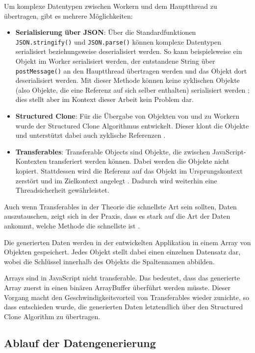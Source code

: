Um komplexe Datentypen zwischen Workern und dem Hauptthread zu übertragen, gibt es mehrere Möglichkeiten:
\begin{itemize}
    \item \textbf{Serialisierung über JSON}: Über die Standardfunktionen \texttt{JSON.stringify()} und \texttt{JSON.parse()} können komplexe Datentypen serialisiert beziehungsweise deserialisiert werden. So kann beispielsweise ein Objekt im Worker serialisiert werden, der entstandene String über \texttt{postMessage()} an den Hauptthread übertragen werden und das Objekt dort deserialisiert werden. Mit dieser Methode können keine zyklischen Objekte (also Objekte, die eine Referenz auf sich selber enthalten) serialisiert werden \cite{mdn:json_stringify}; dies stellt aber im Kontext dieser Arbeit kein Problem dar.
    \item \textbf{Structured Clone}: Für die Übergabe von Objekten von und zu Workern wurde der Structured Clone Algorithmus entwickelt. Dieser klont die Objekte und unterstützt dabei auch zyklische Referenzen \cite{mdn:structured_cloning}.
    \item \textbf{Transferables}: Transferable Objects sind Objekte, die zwischen JavaScript-Kon\-texten transferiert werden können. Dabei werden die Objekte nicht kopiert. Stattdessen wird die Referenz auf das Objekt im Ursprungskontext zerstört und im Zielkontext angelegt \cite{googledev:transferables}. Dadurch wird weiterhin eine Threadsicherheit gewährleistet.
\end{itemize}

Auch wenn Transferables in der Theorie die schnellste Art sein sollten, Daten auszutauschen, zeigt sich in der Praxis, dass es stark auf die Art der Daten ankommt, welche Methode die schnellste ist \cite{transferables1, transferables2, transferables3}.

Die generierten Daten werden in der entwickelten Applikation in einem Array von Objekten gespeichert. Jedes Objekt stellt dabei einen einzelnen Datensatz dar, wobei die Schlüssel innerhalb des Objekts die Spaltennamen abbilden.

Arrays sind in JavaScript nicht transferable. Das bedeutet, dass das generierte Array zuerst in einen binären ArrayBuffer überführt werden müsste. Dieser Vorgang macht den Geschwindigkeitsvorteil von Transferables wieder zunichte, so dass entschieden wurde, die generierten Daten letztendlich über den Structured Clone Algorithm zu übertragen.

\subsection{Ablauf der Datengenerierung}


